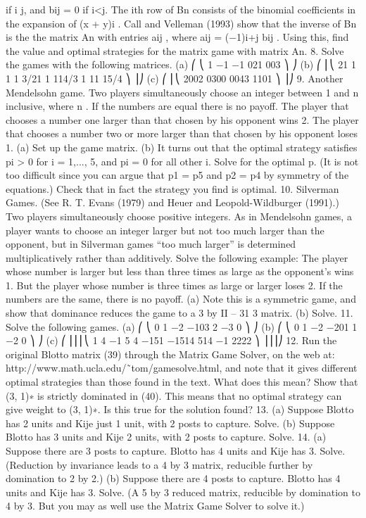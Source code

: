 if i \geq j, and bij = 0 if i<j.
The ith row of Bn consists of the binomial coefficients in the expansion of (x + y)i
. Call
and Velleman (1993) show that the inverse of Bn is the the matrix An with entries aij ,
where aij = (−1)i+j bij . Using this, find the value and optimal strategies for the matrix
game with matrix An.
8. Solve the games with the following matrices.
(a)
⎛
⎝
1 −1 −1
021
003
⎞
⎠ (b)
⎛
⎜⎝
21 1 1
1 3/21 1
114/3 1
11 15/4
⎞
⎟⎠
(c)
⎛
⎜⎝
2002
0300
0043
1101
⎞
⎟⎠
9. Another Mendelsohn game. Two players simultaneously choose an integer
between 1 and n inclusive, where n . If the numbers are equal there is no payoff. The
player that chooses a number one larger than that chosen by his opponent wins 2. The
player that chooses a number two or more larger than that chosen by his opponent loses
1.
(a) Set up the game matrix.
(b) It turns out that the optimal strategy satisfies pi > 0 for i = 1,..., 5, and pi = 0 for all
other i. Solve for the optimal p. (It is not too difficult since you can argue that p1 = p5
and p2 = p4 by symmetry of the equations.) Check that in fact the strategy you find is
optimal.
10. Silverman Games. (See R. T. Evans (1979) and Heuer and Leopold-Wildburger
(1991).) Two players simultaneously choose positive integers. As in Mendelsohn games, a
player wants to choose an integer larger but not too much larger than the opponent, but in
Silverman games “too much larger” is determined multiplicatively rather than additively.
Solve the following example: The player whose number is larger but less than three times
as large as the opponent’s wins 1. But the player whose number is three times as large or
larger loses 2. If the numbers are the same, there is no payoff.
(a) Note this is a symmetric game, and show that dominance reduces the game to a 3 by
II – 31
3 matrix.
(b) Solve.
11. Solve the following games.
(a)
⎛
⎝
0 1 −2
−103
2 −3 0
⎞
⎠ (b)
⎛
⎝
0 1 −2
−201
1 −2 0
⎞
⎠
(c)
⎛
⎜⎜⎜⎝
1 4 −1 5
4 −151
−1514
514 −1
2222
⎞
⎟⎟⎟⎠
12. Run the original Blotto matrix (39) through the Matrix Game Solver, on the
web at: http://www.math.ucla.edu/˜tom/gamesolve.html, and note that it gives different
optimal strategies than those found in the text. What does this mean? Show that (3, 1)∗ is
strictly dominated in (40). This means that no optimal strategy can give weight to (3, 1)∗.
Is this true for the solution found?
13. (a) Suppose Blotto has 2 units and Kije just 1 unit, with 2 posts to capture.
Solve.
(b) Suppose Blotto has 3 units and Kije 2 units, with 2 posts to capture. Solve.
14. (a) Suppose there are 3 posts to capture. Blotto has 4 units and Kije has 3. Solve.
(Reduction by invariance leads to a 4 by 3 matrix, reducible further by domination to 2
by 2.)
(b) Suppose there are 4 posts to capture. Blotto has 4 units and Kije has 3. Solve.
(A 5 by 3 reduced matrix, reducible by domination to 4 by 3. But you may as well use
the Matrix Game Solver to solve it.)
